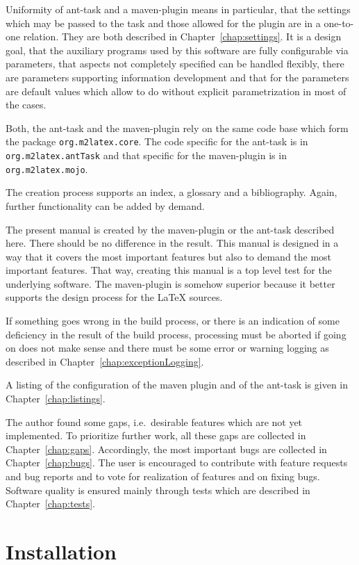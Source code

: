 \documentclass[12pt]{book}
\renewcommand{\index}[1]{ }
\begin{document}
Uniformity of ant-task and a maven-plugin means in particular, 
that the settings which may be passed to the task 
and those allowed for the plugin are in a one-to-one relation. 
They are both described in Chapter~\ref{chap:settings}. 
It is a design goal, that the auxiliary programs 
used by this software are fully configurable via parameters, 
that aspects not completely specified can be handled flexibly, 
there are parameters supporting information development 
and that for the parameters are default values 
which allow to do without explicit parametrization in most of the cases. 
\index{ant-task}
Both, the ant-task and the maven-plugin rely on the same code base 
which form the package \texttt{org.m2latex.core}. 
The code specific for the ant-task is in \texttt{org.m2latex.antTask} 
and that specific for the maven-plugin is in \texttt{org.m2latex.mojo}. 


The creation process supports an index, a glossary and a bibliography. 
Again, further functionality can be added by demand. 

The present manual is created by the maven-plugin or the ant-task 
described here. 
There should be no difference in the result. 
This manual is designed in a way that it covers the most important features 
but also to demand the most important features. 
That way, creating this manual is a top level test 
for the underlying software. 
The maven-plugin is somehow superior 
because it better supports the design process for the \LaTeX{} sources. 

If something goes wrong in the build process, 
or there is an indication 
of some deficiency in the result of the build process, 
processing must be aborted if going on does not make sense 
and there must be some error or warning logging 
as described in Chapter~\ref{chap:exceptionLogging}. 

A listing of the configuration of the maven plugin and of the ant-task 
is given in Chapter~\ref{chap:listings}. 

The author found some gaps, i.e.~desirable features 
which are not yet implemented. 
To prioritize further work, 
all these gaps are collected in Chapter~\ref{chap:gaps}. 
Accordingly, the most important bugs are collected in
Chapter~\ref{chap:bugs}. 
The user is encouraged to contribute with feature requests 
and bug reports and to vote for realization of features 
and on fixing bugs. 
Software quality is ensured mainly through tests 
which are described in Chapter~\ref{chap:tests}. 


\chapter{Installation}\label{chap:install}
\end{document}
